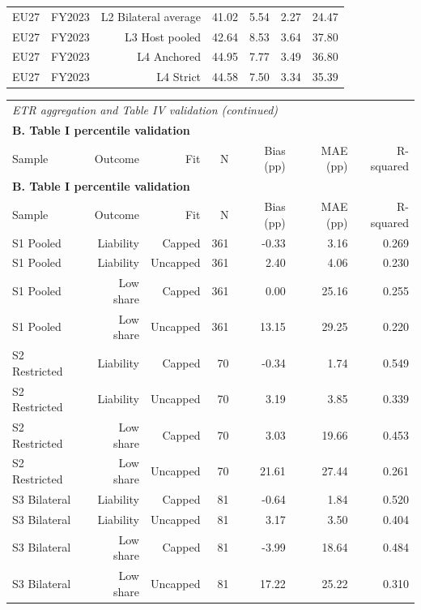 {\begin{longtable}{@{}lrrrrrr@{}}
EU27 & FY2023 & L2 Bilateral average & 41.02 & 5.54 & 2.27 &    24.47 \\
EU27 & FY2023 & L3 Host pooled & 42.64 & 8.53 & 3.64 &    37.80 \\
EU27 & FY2023 & L4 Anchored & 44.95 & 7.77 & 3.49 &    36.80 \\
EU27 & FY2023 & L4 Strict & 44.58 & 7.50 & 3.34 &    35.39 \\
\end{longtable}
\begin{longtable}{@{}lrrrrrr@{}}
\multicolumn{7}{l}{\textit{ETR aggregation and Table IV validation (continued)}} \\
\multicolumn{7}{l}{\textbf{B. Table I percentile validation}} \\
\toprule
Sample & Outcome & Fit & N & Bias (pp) & MAE (pp) & R-squared \\
\midrule
\endfirsthead
\multicolumn{7}{l}{\textbf{B. Table I percentile validation}} \\
\toprule
Sample & Outcome & Fit & N & Bias (pp) & MAE (pp) & R-squared \\
\midrule
\endhead
\midrule
\endfoot
\bottomrule
\endlastfoot
S1 Pooled & Liability & Capped & 361 & -0.33 &  3.16 & 0.269 \\
S1 Pooled & Liability & Uncapped & 361 &  2.40 &  4.06 & 0.230 \\
S1 Pooled & Low share & Capped & 361 &  0.00 & 25.16 & 0.255 \\
S1 Pooled & Low share & Uncapped & 361 & 13.15 & 29.25 & 0.220 \\
S2 Restricted & Liability & Capped &  70 & -0.34 &  1.74 & 0.549 \\
S2 Restricted & Liability & Uncapped &  70 &  3.19 &  3.85 & 0.339 \\
S2 Restricted & Low share & Capped &  70 &  3.03 & 19.66 & 0.453 \\
S2 Restricted & Low share & Uncapped &  70 & 21.61 & 27.44 & 0.261 \\
S3 Bilateral & Liability & Capped &  81 & -0.64 &  1.84 & 0.520 \\
S3 Bilateral & Liability & Uncapped &  81 &  3.17 &  3.50 & 0.404 \\
S3 Bilateral & Low share & Capped &  81 & -3.99 & 18.64 & 0.484 \\
S3 Bilateral & Low share & Uncapped &  81 & 17.22 & 25.22 & 0.310 \\
\end{longtable}
\par{}\par
}
